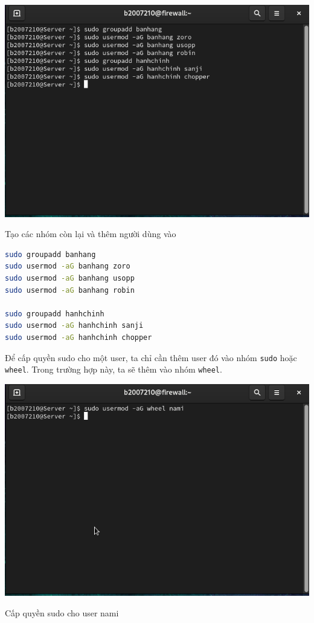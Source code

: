 \documentclass[a4paper, 11pt]{article}
\begin{document}
\begin{minipage}
    {\linewidth}
    \captionsetup{type=figure}
    \centering
    \includegraphics[width=\linewidth]{images/groupadd-other.png}
    \caption{Tạo các nhóm còn lại và thêm người dùng vào}
    \label{figure:groupadd-other}
\end{minipage}

\begin{lstlisting}[language=bash, caption=Tạo các nhóm còn lại và thêm người dùng vào]
sudo groupadd banhang
sudo usermod -aG banhang zoro
sudo usermod -aG banhang usopp
sudo usermod -aG banhang robin

sudo groupadd hanhchinh
sudo usermod -aG hanhchinh sanji
sudo usermod -aG hanhchinh chopper
\end{lstlisting}

Để cấp quyền sudo cho một user, ta chỉ cần thêm user đó vào nhóm \texttt{sudo} hoặc \texttt{wheel}.
Trong trường hợp này, ta sẽ thêm vào nhóm \texttt{wheel}.

\begin{minipage}
    {\linewidth}
    \captionsetup{type=figure}
    \centering
    \includegraphics[width=\linewidth]{images/wheel-nami.png}
    \caption{Cấp quyền sudo cho user nami}
    \label{figure:wheel-nami}
\end{minipage}
\end{document}
